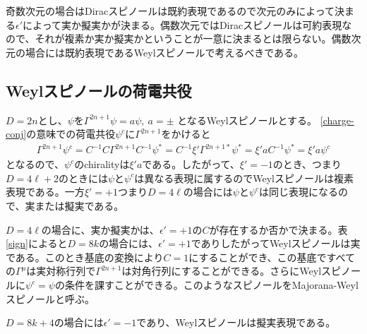 \documentclass[12pt,a4paper,dvipdfmx]{jlreq}
\begin{document}
奇数次元の場合はDiracスピノールは既約表現であるので次元のみによって決まる$\epsilon'$によって実か擬実かが決まる。偶数次元ではDiracスピノールは可約表現なので、それが複素か実か擬実かということが一意に決まるとは限らない。偶数次元の場合には既約表現であるWeylスピノールで考えるべきである。

\subsection{Weylスピノールの荷電共役}
$D=2n$とし、$\psi$を$\Gamma^{2n+1}\psi=a \psi,\ a=\pm$ となるWeylスピノールとする。
\eqref{charge-conj}の意味での荷電共役$\psi^c$に$\Gamma^{2n+1}$をかけると
\begin{align*}
  \Gamma^{2n+1}\psi^{c}
  =C^{-1}C\Gamma^{2n+1}C^{-1}\psi^{*}
  =C^{-1}\xi' \Gamma^{2n+1 *} \psi^{*}
  =\xi' a C^{-1}\psi^{*}
  =\xi' a \psi^{c}
\end{align*}
となるので、$\psi^{c}$のchiralityは$\xi' a$である。したがって、$\xi'=-1$のとき、つまり$D=4\ell+2$のときには$\psi$と$\psi^c$は異なる表現に属するのでWeylスピノールは複素表現である。一方$\xi'=+1$つまり$D=4\ell$の場合には$\psi$と$\psi^c$は同じ表現になるので、実または擬実である。

$D=4\ell$の場合に、実か擬実かは、$\epsilon'=+1$の$C$が存在するか否かで決まる。表\ref{sign}によると$D=8k$の場合には、$\epsilon'=+1$でありしたがってWeylスピノールは実である。このとき基底の変換により$C=1$にすることができ、この基底ですべての$\Gamma^{\mu}$は実対称行列で$\Gamma^{2n+1}$は対角行列にすることができる。さらにWeylスピノールに$\psi^c=\psi$の条件を課すことができる。このようなスピノールをMajorana-Weylスピノールと呼ぶ。

$D=8k+4$の場合には$\epsilon'=-1$であり、Weylスピノールは擬実表現である。
\end{document}
